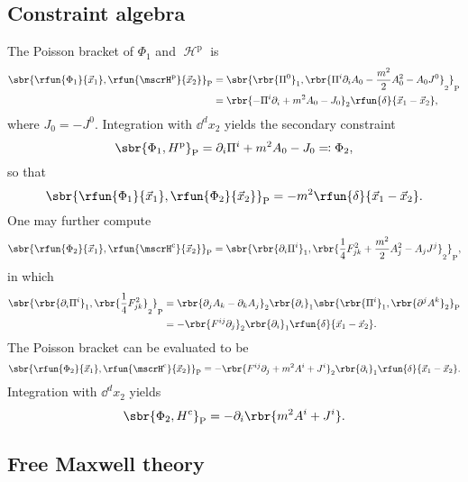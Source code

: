\documentclass[a4paper,11pt]{article}
\begin{document}
\subsection{Constraint algebra}
The Poisson bracket of $\Phi_1$ and $\mscrH^\text{p}$ is
\begin{align}
\sbr{\rfun{\Phi_1}{\vec{x}_1},\rfun{\mscrH^\text{p}}{\vec{x}_2}}_\text{P} &=
\sbr{\rbr{\Pi^0}_1,\rbr{\Pi^i\partial_i A_0-\frac{m^2}{2}A_0^2-A_0 
J^0}_2}_\text{P}
\nonumber \\
&= \rbr{-\Pi^i\partial_i + m^2 A_0 - J_0}_2 
\rfun{\delta}{\vec{x}_1-\vec{x}_2},
\end{align}
where $J_0 = -J^0$. Integration with $\dd^d x_2$ yields the secondary constraint
\begin{equation}
\sbr{\Phi_1, H^\text{p}}_\text{P} = \partial_i \Pi^i + m^2 A_0 - J_0 
\eqqcolon \Phi_2,
\label{eq:secondary-general-MP}
\end{equation}
so that
\begin{equation}
\sbr{\rfun{\Phi_1}{\vec{x}_1},\rfun{\Phi_2}{\vec{x}_2}}_\text{P} = 
-m^2\rfun{\delta}{\vec{x}_1-\vec{x}_2}.
\label{eq:Maxwell-Proca-Q}
\end{equation}
One may further compute
\begin{equation}
\sbr{\rfun{\Phi_2}{\vec{x}_1}, \rfun{\mscrH^\text{c}}{\vec{x}_2}}_\text{P} = 
\sbr{\rbr{\partial_i \Pi^i}_1,
\rbr{\frac{1}{4} F_{jk}^2 + \frac{m^2}{2} A_j^2 - A_j J^j}_2}_\text{P},
\end{equation}
in which
\begin{align}
\sbr{\rbr{\partial_i \Pi^i}_1, \rbr{\frac{1}{4} 
F_{jk}^2}_2}_\text{P} &=
\rbr{\partial_j A_k - \partial_k A_j}_2 \rbr{\partial_i}_1
\sbr{\rbr{\Pi^i}_1, \rbr{\partial^j A^k}_2}_\text{P} \nonumber \\
&= -\rbr{F^{ij} \partial_j}_2 \rbr{\partial_i}_1
\rfun{\delta}{\vec{x}_1-\vec{x}_2}.
\end{align}
The Poisson bracket can be evaluated to be
\begin{equation}
\sbr{\rfun{\Phi_2}{\vec{x}_1}, \rfun{\mscrH^\text{c}}{\vec{x}_2}}_\text{P} =
-\rbr{F^{ij} \partial_j + m^2 A^i + J^i}_2 \rbr{\partial_i}_1 
\rfun{\delta}{\vec{x}_1-\vec{x}_2}.
\end{equation}
Integration with $\dd^d x_2$ yields
\begin{equation}
\sbr{\Phi_2, H^\text{c}}_\text{P} = -\partial_i\rbr{m^2 A^i + J^i}.
\label{eq:persistence-Phi2}
\end{equation}

\subsection{Free Maxwell theory}
\end{document}

